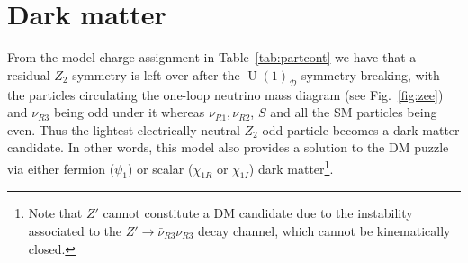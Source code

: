 \documentclass[12pt]{article}
\begin{document}

%
%
%
%
%

\section{Dark matter}
\label{sec:DM}
From the model charge assignment in Table~\ref{tab:partcont} we have
that a residual $Z_2$ symmetry is left over after the
$\operatorname{U}(1)_{\mathcal{D}}$ symmetry breaking, with the
particles circulating the one-loop neutrino mass diagram (see
Fig.~\ref{fig:zee}) and $\nu_{R3}$ being odd under it whereas
$\nu_{R1}, \nu_{R2}$, $S$ and all the SM particles being even. Thus the lightest electrically-neutral $Z_2$-odd
particle becomes a dark matter candidate. In other words, this model
also provides a solution to the DM puzzle via either fermion
($\psi_1$) or scalar ($\chi_{1R}$ or $\chi_{1I}$) dark
matter\footnote{Note that $Z'$ cannot constitute a DM candidate due
  to the instability associated to the $Z'\to\bar{\nu}_{R3}\nu_{R3}$
  decay channel, which cannot be kinematically closed.}.
\end{document}
